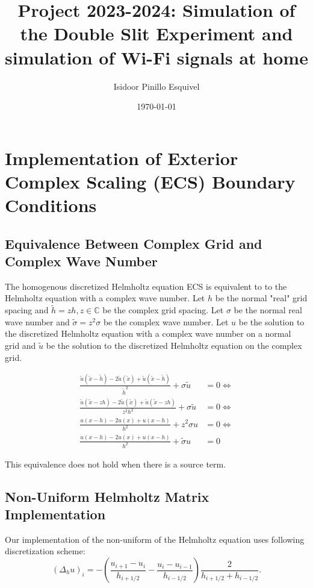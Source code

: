 \documentclass[a4paper,12pt]{article}
\begin{document}
\title{Project 2023-2024: Simulation of the Double Slit Experiment
    and simulation of Wi-Fi signals at home}
\author{Isidoor Pinillo Esquivel}
\date{\today}
\maketitle


\section{Implementation of Exterior Complex Scaling (ECS) Boundary Conditions}
\subsection{Equivalence Between Complex Grid and Complex Wave Number}

The homogenous discretized Helmholtz equation ECS is equivalent to
to the Helmholtz equation with a complex wave number.
Let $h$ be the normal "real" grid spacing and $\tilde{h} = z h, z \in \mathbb{C} $
be the complex grid spacing.
Let $\sigma$ be the normal real wave number and $\tilde{\sigma} = z^{2} \sigma$ be the complex wave number.
Let $u$ be the solution to the discretized Helmholtz equation with a complex wave number on a normal grid
and $\tilde{u}$ be the solution to the discretized Helmholtz equation on the complex grid.

\begin{align}
    \frac{\tilde{u}(\tilde{x}-\tilde{h}) -2 \tilde{u}(\tilde{x}) + \tilde{u}(\tilde{x} - \tilde{h})}{\tilde{h}^2} + \sigma \tilde{u} & = 0  \Leftrightarrow \\
    \frac{\tilde{u}(\tilde{x}-zh) -2 \tilde{u}(\tilde{x}) + \tilde{u}(\tilde{x} - zh)}{z^{2}h^2} + \sigma \tilde{u}                  & = 0  \Leftrightarrow \\
    \frac{u(x-h) -2 u(x) + u(x - h)}{h^2} + z^{2} \sigma u                                                                           & = 0  \Leftrightarrow \\
    \frac{u(x-h) -2 u(x) + u(x - h)}{h^2} + \tilde{\sigma} u                                                                         & = 0
\end{align}

This equivalence does not hold when there is a source term.

\subsection{Non-Uniform Helmholtz Matrix Implementation}
Our implementation of the non-uniform of the Helmholtz equation uses following discretization scheme:
$$
    (\Delta_{h}u)_{i} = -\left( \frac{u_{i+1} - u_{i}}{h_{i+1/2}} - \frac{u_{i} - u_{i-1}}{h_{i-1/2}} \right) \frac{2}{h_{i+1/2} +h_{i-1/2}}
    .
$$
\end{document}
